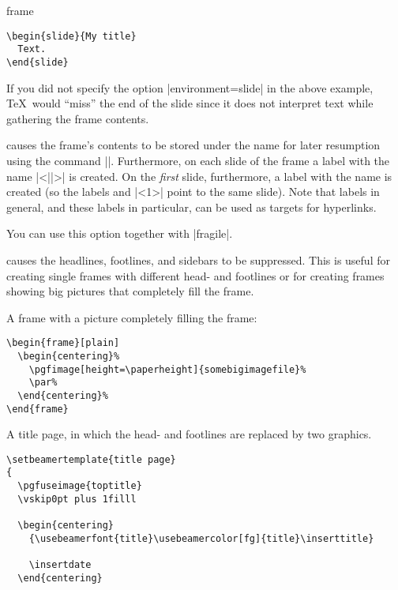 \begin{environment}{{frame}%
    }
\begin{frame}[<+->][plain]
\begin{frame}
\begin{verbatim}
\begin{slide}{My title}
  Text.
\end{slide}
\end{verbatim}
    If you did not specify the option |environment=slide| in the above
    example, \TeX\ would ``miss'' the end of the slide since it does
    not interpret text while gathering the frame contents.
  \item
     causes the frame's contents to
    be stored under the name  for later resumption using
    the command |\againframe|. Furthermore, on each slide of the frame
    a label with the name |<||>| is created. On the
    \emph{first} slide, furthermore, a label with the name 
    is created (so the labels  and |<1>| point
    to the same slide). Note that labels in general, and these labels
    in particular, can be used as targets for hyperlinks.

    You can use this option together with |fragile|.
  \item
     causes  the headlines, footlines,
    and sidebars to be suppressed. This is useful for creating single
    frames with different head- and footlines or for creating frames
    showing big pictures that completely fill the frame.

  \example A frame with a picture completely filling the frame:  
\begin{verbatim}
\begin{frame}[plain]
  \begin{centering}%
    \pgfimage[height=\paperheight]{somebigimagefile}%
    \par%
  \end{centering}%
\end{frame}
\end{verbatim}
  
  \example A title page, in which the head- and footlines are replaced
  by two graphics.
\begin{verbatim}
\setbeamertemplate{title page}
{
  \pgfuseimage{toptitle}
  \vskip0pt plus 1filll

  \begin{centering}
    {\usebeamerfont{title}\usebeamercolor[fg]{title}\inserttitle}
    
    \insertdate
  \end{centering}


\end{verbatim}
\end{frame}
\end{frame}
\end{environment}
